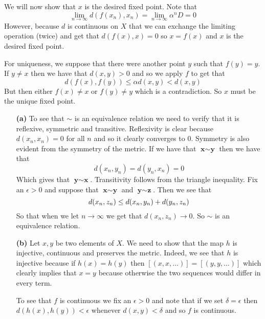 \documentclass{article}
\newcommand{\exercise}[1]{\noindent{\textbf{Exercise #1:}}}
\begin{document}
We will now show that $x$ is the desired fixed point. Note that
\[
\lim_{n\to\infty} d(f(x_n),x_n) = \lim_{n\to\infty} \alpha^n D = 0
\]
However, because $d$ is continuous on $X$ that we can exchange the
limiting operation (twice) and get that $d(f(x),x) = 0$ so $x = f(x)$
and $x$ is the desired fixed point.

For uniqueness, we suppose that there were another point $y$ such that
$f(y) = y$. If $y\neq x$ then we have that $d(x,y) > 0$ and so we
apply $f$ to get that
\[
d(f(x), f(y)) \leq \alpha d(x,y) < d(x,y)
\]
But then either $f(x) \neq x$ or $f(y) \neq y$ which is a
contradiction. So $x$ must be the unique fixed point.
\hfill\qedsymbol

\exercise{43.9}
\begin{enumerate}
\item [\textbf{(a)}] To see that $\sim$ is an equivalence relation we
  need to verify that it is reflexive, symmetric and
  transitive. Reflexivity is clear because $d(x_n,x_n) = 0$ for all
  $n$ and so it clearly converges to 0. Symmetry is also evident from
  the symmetry of the metric. If we have that $\textbf{x} \sim
  \textbf{y}$ then we have that
  \[
  d(x_n,y_n) = d(y_n,x_n) = 0
  \]
  Which gives that $\textbf{y} \sim \textbf{x}$. Transitivity follows
  from the triangle inequality. Fix an $\epsilon > 0$ and suppose that
  $\textbf{x} \sim \textbf{y}$ and $\textbf{y} \sim \textbf{z}$. Then
  we see that
  \[
    d(x_n,z_n) \leq d(x_n,y_n) + d(y_n,z_n) \\
  \]
  So that when we let $n \to \infty$ we get that $d(x_n,z_n) \to
  0$. So $\sim$ is an equivalence relation.
\item [\textbf{(b)}] Let $x,y$ be two elements of $X$. We need to show
  that the map $h$ is injective, continuous and preserves the
  metric. Indeed, we see that $h$ is injective because if $h(x) =
  h(y)$ then $[(x,x,\ldots)] = [(y,y,\ldots)]$ which clearly implies
  that $x = y$ because otherwise the two sequences would differ in
  every term.

  To see that $f$ is continuous we fix an $\epsilon > 0$ and note that
  if we set $\delta = \epsilon$ then $d(h(x),h(y)) < \epsilon$
  whenever $d(x,y) < \delta$ and so $f$ is continuous.


\end{enumerate}
\end{document}
